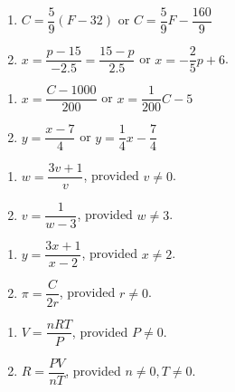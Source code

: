 \documentclass{ximera}
\begin{document}
\begin{multicols}{2}
\begin{enumerate}
\setcounter{enumi}{\value{HW}}
\item  $C = \dfrac{5}{9}(F - 32)$ or  $C = \dfrac{5}{9} F - \dfrac{160}{9}$
\item  $x = \dfrac{p - 15}{-2.5} = \dfrac{15-p}{2.5}$ or $x = -\dfrac{2}{5} p + 6$.
\setcounter{HW}{\value{enumi}}
\end{enumerate}
\end{multicols}

\begin{multicols}{2}
\begin{enumerate}
\setcounter{enumi}{\value{HW}}
\item  $x = \dfrac{C - 1000}{200}$ or $x = \dfrac{1}{200} C - 5$
\item  $y = \dfrac{x-7}{4}$ or $y = \dfrac{1}{4} x - \dfrac{7}{4}$
\setcounter{HW}{\value{enumi}}
\end{enumerate}
\end{multicols}


\begin{multicols}{2}
\begin{enumerate}
\setcounter{enumi}{\value{HW}}
\item  $w = \dfrac{3v+1}{v}$, provided $v \neq 0$.
\item  $v = \dfrac{1}{w-3}$, provided $w \neq 3$.
\setcounter{HW}{\value{enumi}}
\end{enumerate}
\end{multicols}

\begin{multicols}{2}
\begin{enumerate}
\setcounter{enumi}{\value{HW}}
\item $y = \dfrac{3x+1}{x-2}$, provided $x \neq 2$.
\item $\pi = \dfrac{C}{2r}$, provided $r \neq 0$.


\setcounter{HW}{\value{enumi}}
\end{enumerate}
\end{multicols}


\begin{multicols}{2}
\begin{enumerate}
\setcounter{enumi}{\value{HW}}
\item $V = \dfrac{nRT}{P}$, provided $P \neq 0$.
\item $R = \dfrac{PV}{nT}$, provided $n \neq 0, T \neq 0$.
\setcounter{HW}{\value{enumi}}
\end{enumerate}
\end{multicols}
\end{document}
